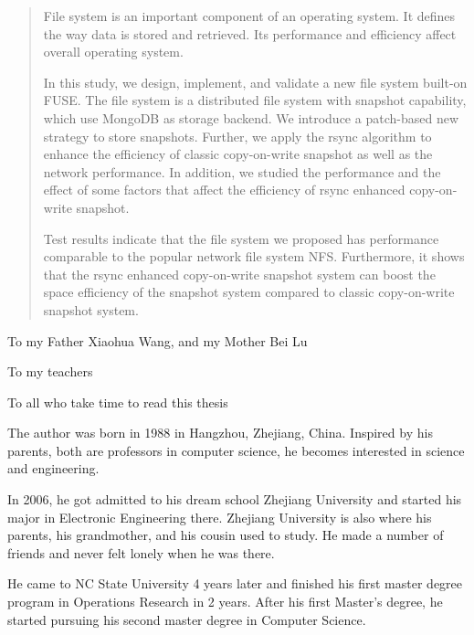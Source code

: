 \begin{abstract}

File system is an important component of an operating system. It defines the way data is stored and retrieved. Its performance and efficiency affect overall operating system.

In this study, we design, implement, and validate a new file system built-on FUSE. The file system is a distributed file system with snapshot capability, which use MongoDB as storage backend. We introduce a patch-based new strategy to store snapshots. Further, we apply the rsync algorithm to enhance the efficiency of classic copy-on-write snapshot as well as the network performance. In addition, we studied the performance and the effect of some factors that affect the efficiency of rsync enhanced copy-on-write snapshot.

Test results indicate that the file system we proposed has performance comparable to the popular network file system NFS. Furthermore, it shows that the rsync enhanced copy-on-write snapshot system can boost the space efficiency of the snapshot system compared to classic copy-on-write snapshot system. 

\end{abstract}

\makecopyrightpage

\maketitlepage

\begin{dedication}
 \centering To my Father Xiaohua Wang, and my Mother Bei Lu

 \centering To my teachers

 \centering To all who take time to read this thesis
\end{dedication}

\begin{biography}

    The author was born in 1988 in Hangzhou, Zhejiang, China. Inspired by his parents, both are professors in computer science, he becomes interested in science and engineering.

    In 2006, he got admitted to his dream school Zhejiang University and started his major in Electronic Engineering there. Zhejiang University is also where his parents, his grandmother, and his cousin used to study. He made a number of friends and never felt lonely when he was there.

    He came to NC State University 4 years later and finished his first master degree program in Operations Research in 2 years. After his first Master's degree, he started pursuing his second master degree in Computer Science.

\end{biography}

